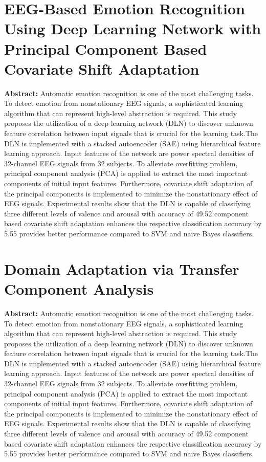 \section{EEG-Based Emotion Recognition Using Deep Learning Network with Principal Component Based Covariate Shift Adaptation}
\textbf{Abstract:}\cite{jirayucharoensak2014eeg}
Automatic emotion recognition is one of the most challenging tasks. To detect emotion from nonstationary EEG signals, a
sophisticated learning algorithm that can represent high-level abstraction is required. This study proposes the utilization of a deep
learning network (DLN) to discover unknown feature correlation between input signals that is crucial for the learning task.The DLN
is implemented with a stacked autoencoder (SAE) using hierarchical feature learning approach. Input features of the network are
power spectral densities of 32-channel EEG signals from 32 subjects. To alleviate overfitting problem, principal component analysis
(PCA) is applied to extract the most important components of initial input features. Furthermore, covariate shift adaptation of
the principal components is implemented to minimize the nonstationary effect of EEG signals. Experimental results show that the
DLN is capable of classifying three different levels of valence and arousal with accuracy of 49.52%
component based covariate shift adaptation enhances the respective classification accuracy by 5.55%
provides better performance compared to SVM and naive Bayes classifiers.

\section{Domain Adaptation via Transfer Component Analysis}
\textbf{Abstract:}\cite{pan2011domain}
Automatic emotion recognition is one of the most challenging tasks. To detect emotion from nonstationary EEG signals, a
sophisticated learning algorithm that can represent high-level abstraction is required. This study proposes the utilization of a deep
learning network (DLN) to discover unknown feature correlation between input signals that is crucial for the learning task.The DLN
is implemented with a stacked autoencoder (SAE) using hierarchical feature learning approach. Input features of the network are
power spectral densities of 32-channel EEG signals from 32 subjects. To alleviate overfitting problem, principal component analysis
(PCA) is applied to extract the most important components of initial input features. Furthermore, covariate shift adaptation of
the principal components is implemented to minimize the nonstationary effect of EEG signals. Experimental results show that the
DLN is capable of classifying three different levels of valence and arousal with accuracy of 49.52%
component based covariate shift adaptation enhances the respective classification accuracy by 5.55%
provides better performance compared to SVM and naive Bayes classifiers.

